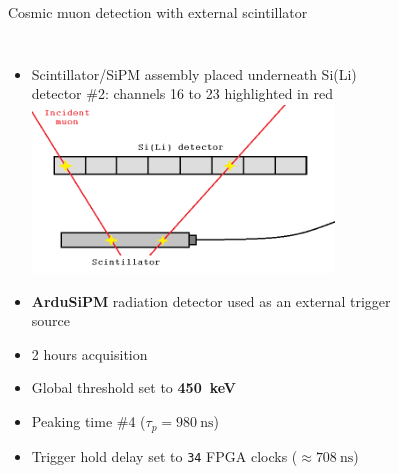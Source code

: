 \documentclass[aspectratio=169,xcolor=dvipsnamesz]{beamer} %
\begin{document}
\begin{frame}{Cosmic muon detection with external scintillator}
    \addtolength{\leftmargini}{\labelsep}
    \fontsize{9pt}{1}\selectfont
    \begin{columns}
        \begin{itemize}
            \item Scintillator/SiPM assembly placed underneath Si(Li) detector \#2: channels 16 to 23 highlighted in red
            \vskip0.4cm
            \includegraphics[width=0.8\textwidth]{images/muon_detection/scintillator_sensor_detail.png}
            \vskip0.4cm
            \item \textbf{ArduSiPM} radiation detector used as an external trigger source
            \item 2 hours acquisition
            \item Global threshold set to \textbf{\SI{450}{\kilo\electronvolt}}
            \item Peaking time \#4 ($\tau_{p} = \SI{980}{\nano\second}$)
            \item Trigger hold delay set to \texttt{34} FPGA clocks ($\approx \SI{708}{\nano\second}$)
        \end{itemize}
            \vskip-0.2cm
            \begin{figure}[h!]
                \centering
                \begin{tabular}{c c}

\end{tabular}
\end{figure}
\end{columns}
\end{frame}
\end{document}
